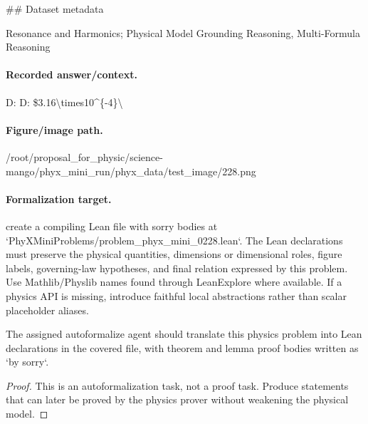\#\# Dataset metadata

Resonance and Harmonics; Physical Model Grounding Reasoning, Multi-Formula Reasoning

\paragraph{Recorded answer/context.}
D: D: \$3.16\textbackslash{}times10\textasciicircum{}\{-4\}\textbackslash{}

\paragraph{Figure/image path.}
/root/proposal\_for\_physic/science-mango/phyx\_mini\_run/phyx\_data/test\_image/228.png

\paragraph{Formalization target.}
create a compiling Lean file with sorry bodies at `PhyXMiniProblems/problem\_phyx\_mini\_0228.lean`. The Lean declarations must preserve the physical quantities, dimensions or dimensional roles, figure labels, governing-law hypotheses, and final relation expressed by this problem.
Use Mathlib/Physlib names found through LeanExplore where available. If a physics API is missing, introduce faithful local abstractions rather than scalar placeholder aliases.

\begin{theorem}
\label{thm:physics:phyx_mini_0228:target}
The assigned autoformalize agent should translate this physics problem into Lean declarations in the covered file, with theorem and lemma proof bodies written as `by sorry`.
\end{theorem}
\begin{proof}
This is an autoformalization task, not a proof task. Produce statements that can later be proved by the physics prover without weakening the physical model.
\end{proof}

